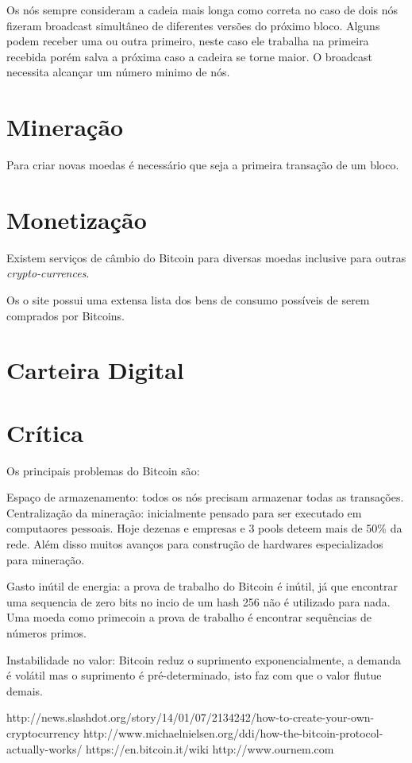\documentclass[a4paper,11pt]{article}
\theoremstyle{mytheor}
\begin{document}
Os nós sempre consideram a cadeia mais longa como correta no caso de dois nós fizeram broadcast simultâneo de diferentes versões do próximo bloco. Alguns podem receber uma ou outra primeiro, neste caso ele trabalha na primeira recebida porém salva a próxima caso a cadeira se torne maior. O broadcast necessita alcançar um número minimo de nós.

\section*{Mineração}
Para criar novas moedas é necessário que seja a primeira transação de um bloco.
\section*{Monetização}

Existem serviços de câmbio do Bitcoin para diversas moedas inclusive para outras \textit{crypto-currences}.

Os o site \cite{trade} possui uma extensa lista dos bens de consumo possíveis de serem comprados por Bitcoins.

\section*{Carteira Digital}

\section*{Crítica}

Os principais problemas do Bitcoin são:

Espaço de armazenamento: todos os nós precisam armazenar todas as transações.
Centralização da mineração: inicialmente pensado para ser executado em computaores pessoais. Hoje dezenas e empresas e 3 pools deteem mais de 50\% da rede. Além disso muitos avanços para construção de hardwares especializados para mineração.

Gasto inútil de energia: a prova de trabalho do Bitcoin é inútil, já que encontrar uma sequencia de zero bits no incio de um hash 256 não é utilizado para nada. Uma moeda como primecoin a prova de trabalho é encontrar sequências de números primos.

Instabilidade no valor: Bitcoin reduz o suprimento exponencialmente, a demanda é volátil mas o suprimento é pré-determinado, isto faz com que o valor flutue demais.


{}
http://news.slashdot.org/story/14/01/07/2134242/how-to-create-your-own-cryptocurrency
http://www.michaelnielsen.org/ddi/how-the-bitcoin-protocol-actually-works/
https://en.bitcoin.it/wiki
http://www.ournem.com


\end{document}
